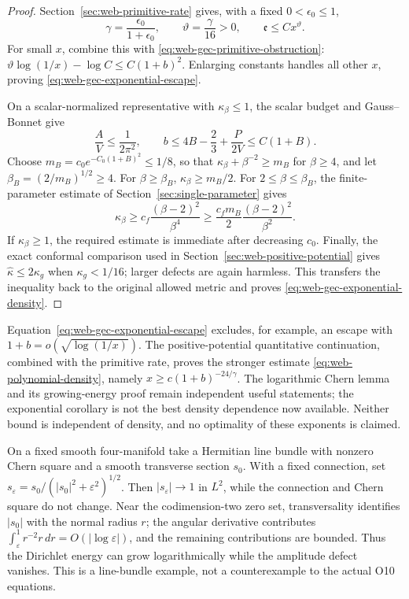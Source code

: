 \begin{proof}
Section~\ref{sec:web-primitive-rate} gives, with a fixed
\(0<\epsilon_0\le1\),
\[
 \gamma=\frac{\epsilon_0}{1+\epsilon_0},\qquad
 \vartheta=\frac\gamma{16}>0,\qquad
 \mathfrak e\le Cx^\vartheta.
\]
For small \(x\), combine this with
\eqref{eq:web-gec-primitive-obstruction}:
\(\vartheta\log(1/x)-\log C\le C(1+b)^2\).
Enlarging constants handles all other \(x\), proving
\eqref{eq:web-gec-exponential-escape}.

On a scalar-normalized representative with \(\kappa_\beta\le1\),
the scalar budget and Gauss--Bonnet give
\[
 \frac AV\le\frac1{2\pi^2},\qquad
 b\le4B-\frac23+\frac P{2V}\le C(1+B).
\]
Choose \(m_B=c_0e^{-C_0(1+B)^2}\le1/8\), so that
\(\kappa_\beta+\beta^{-2}\ge m_B\) for \(\beta\ge4\), and let
\(\beta_B=(2/m_B)^{1/2}\ge4\).  For \(\beta\ge\beta_B\),
\(\kappa_\beta\ge m_B/2\).  For \(2\le\beta\le\beta_B\), the
finite-parameter estimate of Section~\ref{sec:single-parameter} gives
\[
 \kappa_\beta\ge c_f\frac{(\beta-2)^2}{\beta^4}
       \ge\frac{c_fm_B}{2}\frac{(\beta-2)^2}{\beta^2}.
\]
If \(\kappa_\beta\ge1\), the required estimate is immediate after
decreasing \(c_0\).  Finally, the exact conformal comparison used in
Section~\ref{sec:web-positive-potential} gives
\(\widehat\kappa\le2\kappa_g\) when \(\kappa_g<1/16\);
larger defects are again harmless.  This transfers the inequality back to
the original allowed metric and proves
\eqref{eq:web-gec-exponential-density}.
\end{proof}

\begin{remark}
Equation~\eqref{eq:web-gec-exponential-escape} excludes, for example,
an escape with \(1+b=o(\sqrt{\log(1/x)})\).  The positive-potential
quantitative continuation, combined with the primitive rate, proves the
stronger estimate \eqref{eq:web-polynomial-density}, namely
\(x\ge c(1+b)^{-24/\gamma}\).  The logarithmic Chern lemma and its
growing-energy proof remain independent useful statements; the exponential
corollary is not the best density dependence now available.  Neither bound
is independent of density, and no optimality of these exponents is claimed.
\end{remark}

\begin{remark}
On a fixed smooth four-manifold take a Hermitian line bundle with nonzero
Chern square and a smooth transverse section \(s_0\).  With a fixed
connection, set
\(s_\varepsilon=s_0/(|s_0|^2+\varepsilon^2)^{1/2}\).
Then \(|s_\varepsilon|\to1\) in \(L^2\), while the connection and
Chern square do not change.  Near the codimension-two zero set, transversality
identifies \(|s_0|\) with the normal radius \(r\); the angular derivative
contributes \(\int_\varepsilon^1r^{-2}r\,dr=O(|\log\varepsilon|)\),
and the remaining contributions are bounded.  Thus the Dirichlet energy
can grow logarithmically while the amplitude defect vanishes.  This is a
line-bundle example, not a counterexample to the actual O10 equations.
\end{remark}

